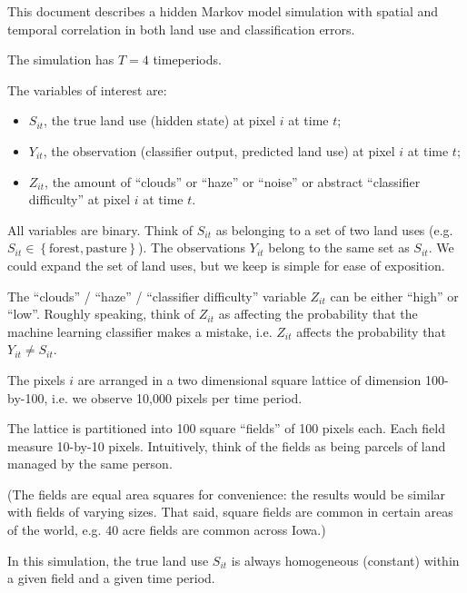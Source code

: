 \documentclass[12pt]{article}
\begin{document}
This document describes a hidden Markov model simulation with spatial and temporal correlation
in both land use and classification errors.

The simulation has $T=4$ timeperiods.

The variables of interest are:
\begin{itemize}
\item $S_{it}$, the true land use (hidden state) at pixel $i$ at time $t$;
\item $Y_{it}$, the observation (classifier output, predicted land use) at pixel $i$ at time $t$;
\item $Z_{it}$, the amount of ``clouds'' or ``haze'' or ``noise'' or abstract ``classifier difficulty'' at pixel $i$ at time $t$.
\end{itemize}

All variables are binary.
Think of $S_{it}$ as belonging to a set of two land uses (e.g. $S_{it} \in \left\{\textrm{forest}, \textrm{pasture}\right\}$).
The observations $Y_{it}$ belong to the same set as $S_{it}$. We could expand the set of land uses, but we keep is simple for ease of exposition.

The ``clouds'' / ``haze'' / ``classifier difficulty'' variable $Z_{it}$ can be either ``high'' or ``low''.
Roughly speaking, think of $Z_{it}$ as affecting the probability that the machine learning classifier
makes a mistake, i.e. $Z_{it}$ affects the probability that $Y_{it} \neq S_{it}$.

The pixels $i$ are arranged in a two dimensional square lattice of dimension 100-by-100,
i.e. we observe 10,000 pixels per time period.

The lattice is partitioned into 100 square ``fields'' of 100 pixels each.
Each field measure 10-by-10 pixels.
Intuitively, think of the fields as being parcels of land managed by the same person.

(The fields are equal area squares for convenience: the results would be similar with fields of varying sizes.
That said, square fields are common in certain areas of the world, e.g. 40 acre fields are common across Iowa.)

In this simulation, the true land use $S_{it}$ is always homogeneous (constant) within a given field and a given time period.
\end{document}
